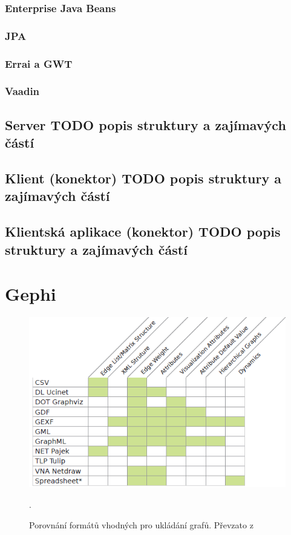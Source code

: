 \documentclass[thesis=M,czech]{FITthesis}[2014/05/6]
\begin{document}
\subsection{Enterprise Java Beans}
\subsection{JPA}
\subsection{Errai a GWT}
\subsection{Vaadin}

\section{Server TODO popis struktury a zajímavých částí}
\section{Klient (konektor) TODO popis struktury a zajímavých částí}
\section{Klientská aplikace (konektor) TODO popis struktury a zajímavých částí}

\begin{conclusion}
\end{conclusion}




\appendix
\chapter{Gephi}
\begin{figure}\centering
 	\includegraphics[width=1\textwidth]{images/gephi/graph-format-table-comparison}
 	\caption[Porovnání formátů vhodných pro ukládání grafů]{Porovnání formátů vhodných pro ukládání grafů. Převzato z \cite{gephi}}.\label{fig:gephi-formats-comparation}
\end{figure}
\end{document}
